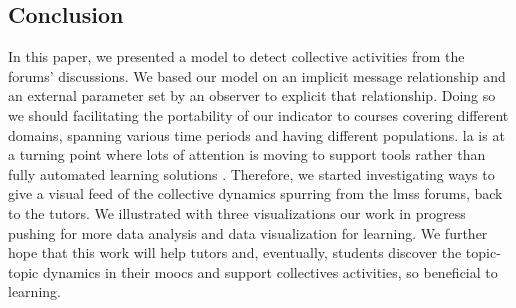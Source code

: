 \documentclass[a4paper,twoside]{article}
\begin{document}
\subsection{Conclusion}
In this paper, we presented a model to detect collective activities from the forums' discussions.  We based our model on an implicit message relationship and an external parameter set by an observer to explicit that relationship.  Doing so we should facilitating the portability of our indicator to courses covering different domains, spanning various time periods and having different populations. %
\gls{la} is at a turning point where lots of attention is moving to support tools rather than fully automated learning solutions \citep{Kone2018,Baker2016}.
Therefore, we started investigating ways to give a visual feed of the collective dynamics spurring from the \glspl{lms} forums, back to the tutors.  We illustrated with three visualizations our work in progress pushing for more data analysis and data visualization for learning.  We further hope that this work will help tutors and, eventually, students  discover the topic-topic dynamics in their \glspl{mooc} and support collectives activities, so beneficial to learning.

\vfill 



\small{}

\vfill
\end{document}
